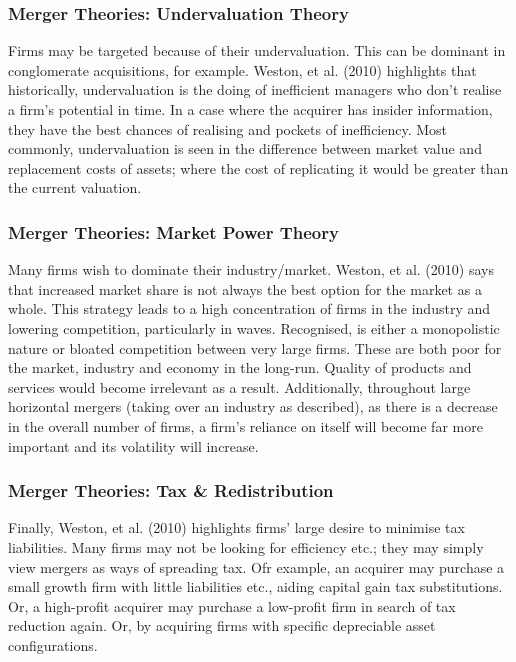 \documentclass[11pt, english]{article}
\begin{document}
		\subsubsection*{Merger Theories: Undervaluation Theory}

	Firms may be targeted because of their undervaluation. This can be dominant in conglomerate acquisitions, for example. Weston, et al. (2010) highlights that historically, undervaluation is the doing of inefficient managers who don't realise a firm's potential in time. In a case where the acquirer has insider information, they have the best chances of realising and pockets of inefficiency. Most commonly, undervaluation is seen in the difference between market value and replacement costs of assets; where the cost of replicating it would be greater than the current valuation.

		\subsubsection*{Merger Theories: Market Power Theory}

	Many firms wish to dominate their industry/market. Weston, et al. (2010) says that increased market share is not always the best option for the market as a whole. This strategy leads to a high concentration of firms in the industry and lowering competition, particularly in waves. Recognised, is either a monopolistic nature or bloated competition between very large firms. These are both poor for the market, industry and economy in the long-run. Quality of products and services would become irrelevant as a result. Additionally, throughout large horizontal mergers (taking over an industry as described), as there is a decrease in the overall number of firms, a firm's reliance on itself will become far more important and its volatility will increase.

		\subsubsection*{Merger Theories: Tax \& Redistribution}

	Finally, Weston, et al. (2010) highlights firms' large desire to minimise tax liabilities. Many firms may not be looking for efficiency etc.; they may simply view mergers as ways of spreading tax. Ofr example, an acquirer may purchase a small growth firm with little liabilities etc., aiding capital gain tax substitutions. Or, a high-profit acquirer may purchase a low-profit firm in search of tax reduction again. Or, by acquiring firms with specific depreciable asset configurations.\\
\end{document}
